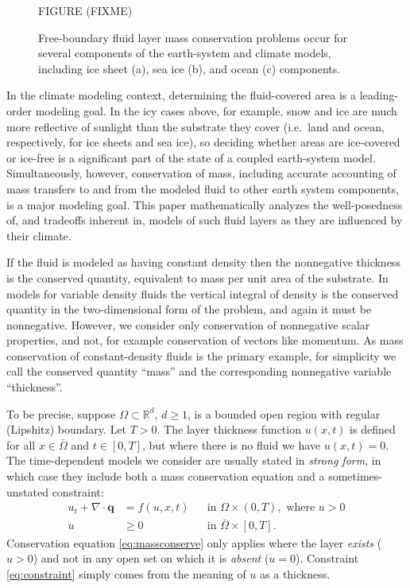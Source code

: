 \documentclass[final,leqno,onefignum,onetabnum]{siamltex1213bueler}
\newcommand\bq{\mathbf{q}}
\newcommand{\Div}{\nabla\cdot}
\newcommand\RR{\mathbb{R}}
\begin{document}
\begin{figure}[ht]
\begin{center}
FIGURE (FIXME)
\end{center}
\caption{Free-boundary fluid layer mass conservation problems occur for several components of the earth-system and climate models, including ice sheet (a), sea ice (b), and ocean (c) components.}
\label{fig:climatepictures}
\end{figure}

In the climate modeling context, determining the fluid-covered area is a leading-order modeling goal.  In the icy cases above, for example, snow and ice are much more reflective of sunlight than the substrate they cover (i.e.~land and ocean, respectively, for ice sheets and sea ice), so deciding whether areas are ice-covered or ice-free is a significant part of the state of a coupled earth-system model.  Simultaneously, however, conservation of mass, including accurate accounting of mass transfers to and from the modeled fluid to other earth system components, is a major modeling goal.  This paper mathematically analyzes the well-posedness of, and tradeoffs inherent in, models of such fluid layers as they are influenced by their climate.

If the fluid is modeled as having constant density then the nonnegative thickness is the conserved quantity, equivalent to mass per unit area of the substrate.  In models for variable density fluids the vertical integral of density is the conserved quantity in the two-dimensional form of the problem, and again it must be nonnegative.  However, we consider only conservation of nonnegative scalar properties, and not, for example conservation of vectors like momentum.  As mass conservation of constant-density fluids is the primary example, for simplicity we call the conserved quantity ``mass'' and the corresponding nonnegative variable ``thickness''.

To be precise, suppose $\Omega \subset \RR^d$, $d\ge 1$, is a bounded open region with regular (Lipshitz) boundary.  Let $T>0$.  The layer thickness function $u(x,t)$ is defined for all $x\in \bar\Omega$ and $t \in [0,T]$, but where there is no fluid we have $u(x,t)=0$.  The time-dependent models we consider are usually stated in \emph{strong form}, in which case they include both a mass conservation equation and a sometimes-unstated constraint:
\begin{align}
u_t + \Div \bq &= f(u,x,t) &&\text{in } \Omega \times (0,T), \text{ where } u > 0 \label{eq:massconserve} \\
u &\ge 0 &&\text{in } \bar\Omega \times [0,T]. \label{eq:constraint}
\end{align}
Conservation equation \eqref{eq:massconserve} only applies where the layer \emph{exists} ($u>0$) and not in any open set on which it is \emph{absent} ($u=0$).  Constraint \eqref{eq:constraint} simply comes from the meaning of $u$ as a thickness.
\end{document}
